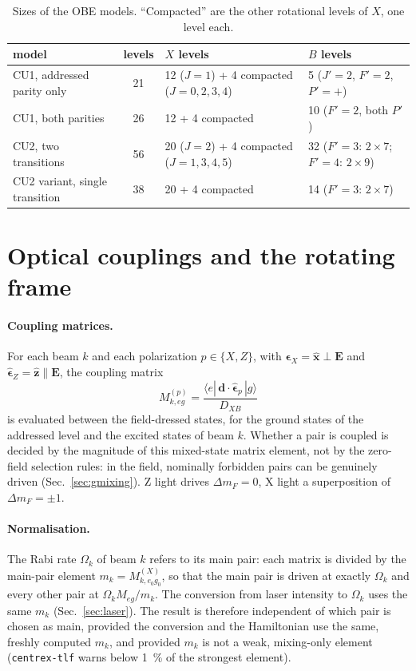 \documentclass[11pt,a4paper,oneside]{report}
\newcommand{\code}[1]{\texttt{#1}}
\newcommand{\Dxb}{D_{XB}}
\begin{document}
\begin{table}[htbp]
  \centering
  \caption[Sizes of the OBE models]{Sizes of the OBE models. ``Compacted'' are the other
  rotational levels of $X$, one level each.}
  \label{tab:models}
  \small
  \begin{tabularx}{\textwidth}{lcLL}
    \toprule
    model & levels & $X$ levels & $B$ levels \\
    \midrule
    CU1, addressed parity only & 21 & 12 ($J=1$) + 4 compacted ($J=0,2,3,4$) & 5 ($J'=2$, $F'=2$, $P'=+$) \\
    CU1, both parities & 26 & 12 + 4 compacted & 10 ($F'=2$, both $P'$) \\
    CU2, two transitions & 56 & 20 ($J=2$) + 4 compacted ($J=1,3,4,5$) & 32 ($F'=3$: $2\times7$; $F'=4$: $2\times9$) \\
    CU2 variant, single transition & 38 & 20 + 4 compacted & 14 ($F'=3$: $2\times7$) \\
    \bottomrule
  \end{tabularx}
\end{table}

\section{Optical couplings and the rotating frame}
\label{sec:couplings}

\paragraph{Coupling matrices.} For each beam $k$ and each polarization $p\in\{X,Z\}$, with
$\hat{\boldsymbol\epsilon}_X=\hat{\mathbf x}\perp\mathbf E$ and
$\hat{\boldsymbol\epsilon}_Z=\hat{\mathbf z}\parallel\mathbf E$, the coupling matrix
\begin{equation}
  M^{(p)}_{k,eg}=\frac{\langle e|\,\mathbf d\cdot\hat{\boldsymbol\epsilon}_p\,|g\rangle}{\Dxb}
\end{equation}
is evaluated between the field-dressed states, for the ground states of the addressed level
and the excited states of beam $k$. Whether a pair is coupled is decided by the magnitude
of this mixed-state matrix element, not by the zero-field selection rules: in the field,
nominally forbidden pairs can be genuinely driven (Sec.~\ref{sec:gmixing}). Z light drives
$\Delta m_F=0$, X light a superposition of $\Delta m_F=\pm1$.

\paragraph{Normalisation.} The Rabi rate $\Omega_k$ of beam $k$ refers to its main pair: each
matrix is divided by the main-pair element $m_k=M^{(X)}_{k,e_0g_0}$, so that the main pair is
driven at exactly $\Omega_k$ and every other pair at $\Omega_k M_{eg}/m_k$. The conversion
from laser intensity to $\Omega_k$ uses the same $m_k$ (Sec.~\ref{sec:laser}). The result is
therefore independent of which pair is chosen as main, provided the conversion and the
Hamiltonian use the same, freshly computed $m_k$, and provided $m_k$ is not a weak,
mixing-only element (\code{centrex-tlf} warns below \SI{1}{\percent} of the strongest
element).
\end{document}
